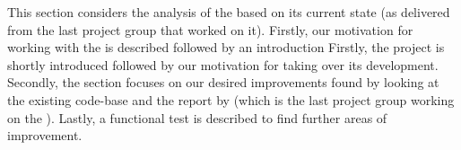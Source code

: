 This section considers the analysis of the \launcher based on its current state (as delivered from the last project group that worked on it).
Firstly, our motivation for working with the \launcher is described followed by an introduction 
Firstly, the \launcher project is shortly introduced followed by our motivation for taking over its development.
Secondly, the section focuses on our desired improvements found by looking at the existing code-base and the report by \citet{launcher2012} (which is the last project group working on the \launcher).
Lastly, a functional test is described to find further areas of improvement.